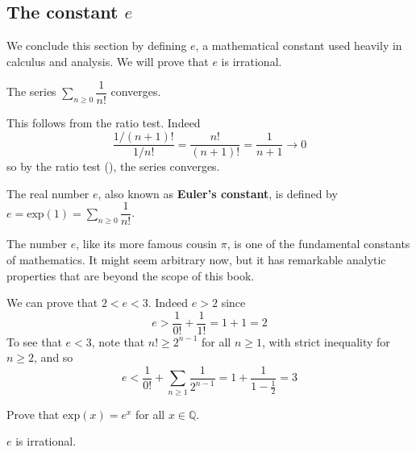 \subsection*{The constant $e$}

We conclude this section by defining $e$, a mathematical constant used heavily in calculus and analysis. We will prove that $e$ is irrational.

\begin{lemma}
The series $\displaystyle \sum_{n \ge 0} \dfrac{1}{n!}$ converges.
\end{lemma}

\begin{cproof}
This follows from the ratio test. Indeed
\[ \dfrac{1/(n+1)!}{1/n!} = \dfrac{n!}{(n+1)!} = \dfrac{1}{n+1} \to 0 \]
so by the ratio test (), the series converges.
\end{cproof}

\begin{definition}
\label{defE}
The real number $e$, also known as \textbf{Euler's constant}, is defined by $e = \mathrm{exp}(1) = \sum_{n \ge 0} \dfrac{1}{n!}$.
\end{definition}

The number $e$, like its more famous cousin $\pi$, is one of the fundamental constants of mathematics. It might seem arbitrary now, but it has remarkable analytic properties that are beyond the scope of this book.

\begin{example}
We can prove that $2<e<3$. Indeed $e>2$ since
\[ e > \frac{1}{0!} + \dfrac{1}{1!} = 1 + 1 = 2 \]
To see that $e < 3$, note that $n! \ge 2^{n-1}$ for all $n \ge 1$, with strict inequality for $n \ge 2$, and so
\[ e < \frac{1}{0!} + \sum_{n \ge 1} \dfrac{1}{2^{n-1}} = 1 + \dfrac{1}{1-\frac{1}{2}} = 3 \]
\end{example}

\begin{exercise}
Prove that $\mathrm{exp}(x) = e^x$ for all $x \in \mathbb{Q}$.
\end{exercise}

\begin{theorem}
\label{thmEIsIrrational}
$e$ is irrational.
\end{theorem}

